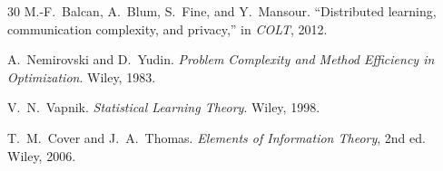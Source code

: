 \documentclass[12pt,a4paper]{article}
\begin{document}
\begin{thebibliography}{30}
M.-F.~Balcan, A.~Blum, S.~Fine, and Y.~Mansour.
\newblock ``Distributed learning, communication complexity, and privacy,''
\newblock in \emph{COLT}, 2012.

A.~Nemirovski and D.~Yudin.
\newblock \emph{Problem Complexity and Method Efficiency in Optimization}.
\newblock Wiley, 1983.

V.~N.~Vapnik.
\newblock \emph{Statistical Learning Theory}.
\newblock Wiley, 1998.

T.~M.~Cover and J.~A.~Thomas.
\newblock \emph{Elements of Information Theory}, 2nd ed.
\newblock Wiley, 2006.

\end{thebibliography}
\end{document}
